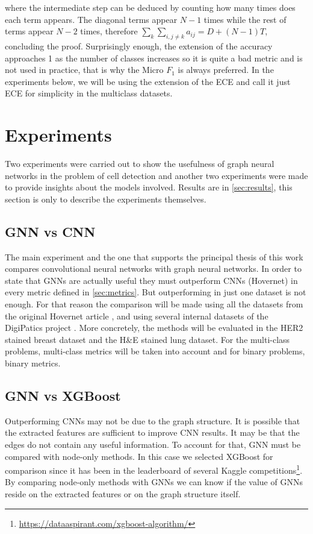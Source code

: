 where the intermediate step can be deduced by counting how many times does each term appears. The diagonal terms appear $N-1$ times while the rest of terms appear $N-2$ times, therefore $\sum_{k} \sum_{i,j\neq k} a_{ij} = D + (N-1)T$, concluding the proof. Surprisingly enough, the extension of the accuracy approaches 1 as the number of classes increases so it is quite a bad metric and is not used in practice, that is why the Micro $F_1$ is always preferred. In the experiments below, we will be using the extension of the ECE and call it just ECE for simplicity in the multiclass datasets.

\section{Experiments}\label{sec:exp}

Two experiments were carried out to show the usefulness of graph neural networks in the problem of cell detection and another two experiments were made to provide insights about the models involved. Results are in \autoref{sec:results}, this section is only to describe the experiments themselves. 


\subsection{GNN vs CNN}\label{subsec:gnn-cnn}

The main experiment and the one that supports the principal thesis of this work compares convolutional neural networks with graph neural networks. In order to state that GNNs are actually useful they must outperform CNNs (Hovernet) in every metric defined in \autoref{sec:metrics}. But outperforming in just one dataset is not enough. For that reason the comparison will be made using all the datasets from the original Hovernet article \cite{hovernet, gamper2020pannuke, 8880654}, and using several internal datasets of the DigiPatics project \cite{DigiPatics2022}. More concretely, the methods will be evaluated in the HER2 stained breast dataset and the H\&E stained lung dataset. For the multi-class problems, multi-class metrics will be taken into account and for binary problems, binary metrics.

\subsection{GNN vs XGBoost}\label{subsec:gnn-xgb}

Outperforming CNNs may not be due to the graph structure. It is possible that the extracted features are sufficient to improve CNN results. It may be that the edges do not contain any useful information. To account for that, GNN must be compared with node-only methods. In this case we selected XGBoost \cite{xgboost} for comparison since it has been in the leaderboard of several Kaggle competitions\footnote{\url{https://dataaspirant.com/xgboost-algorithm/}}. By comparing node-only methods with GNNs we can know if the value of GNNs reside on the extracted features or on the graph structure itself.

